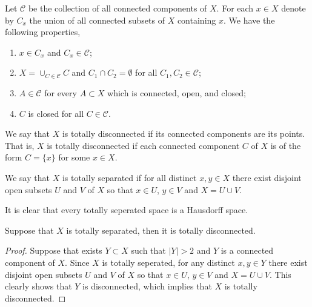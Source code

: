 \documentclass[11pt,a4paper]{article}
\begin{document}
\begin{proposition}
  Let $\mathcal C$ be the collection of all connected components of $X$.
  For each $x \in X$ denote by $C_x$ the union of all connected subsets 
  of $X$ containing $x$.
  We have the following properties,
  \begin{enumerate}
    \item[(1)] $x \in C_x$ and $C_x \in \mathcal C$;
    \item[(2)] $X = \cup_{C \in \mathcal C} C$ and $C_1 \cap C_2 = \emptyset$
      for all $C_1,C_2 \in \mathcal C$;
    \item[(3)] $A \in \mathcal C$ for every $A \subset X$ which is connected,
      open, and closed;
    \item[(4)] $C$ is closed for all $C \in \mathcal C$.
  \end{enumerate}
\end{proposition}

\begin{definition}
  We say that $X$ is totally disconnected if its connected components
  are its points.
  That is, $X$ is totally disconnected if each connected component $C$
  of $X$ is of the form $C = \{x\}$ for some $x \in X$.
\end{definition}

\begin{definition}
  We say that $X$ is totally separated if for all distinct $x, y \in X$
  there exist disjoint open subsets $U$ and $V$ of $X$ so that 
  $x \in U$, $y \in V$ and $X = U \cup V$.
\end{definition}

\begin{remark}
  It is clear that every totally seperated space is a Hausdorff space.
\end{remark}

\begin{proposition}
  Suppose that $X$ is totally separated, then it is totally disconnected.
\end{proposition}
\begin{proof}
  Suppose that exists $Y \subset X$ such that $|Y| > 2$ and
  $Y$ is a connected component of $X$.
  Since $X$ is totally seperated, for any distinct $x, y \in Y$ there
  exist disjoint open subsets $U$ and $V$ of $X$ so that 
  $x \in U$, $y \in V$ and $X = U \cup V$.
  This clearly shows that $Y$ is disconnected, which implies that $X$ is
  totally disconnected.
\end{proof}
\end{document}
